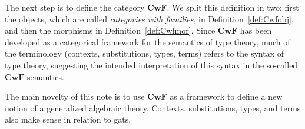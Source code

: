 \documentclass{lmcs}
\def\Cwf{\mathbf{CwF}}
\begin{document}
The next step is to define the category $\Cwf$.
We split this definition in two: first the objects,
which are called \emph{categories with families}, in Definition~\ref{def:Cwfobj},
and then the morphisms in Definition~\ref{def:Cwfmor}.
Since $\Cwf$ has been developed as a categorical framework for the semantics of
type theory, much of the terminology (contexts, substitutions,
types, terms) refers to the syntax of type theory,
suggesting the intended interpretation of this syntax in the
so-called $\Cwf$-semantics.

The main novelty of this note is to use $\Cwf$ as a framework
to define a new notion of a generalized algebraic theory.
Contexts, substitutions, types, and terms also make
sense in relation to gats.
\end{document}
